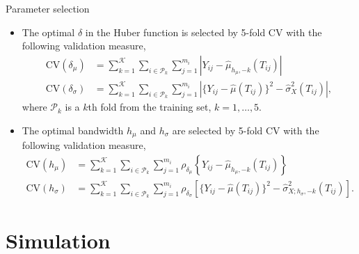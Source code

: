 \documentclass[9pt]{beamer}
\begin{document}
\begin{frame}[allowframebreaks]{Parameter selection}
	\begin{itemize}
		\item{
			The optimal $\delta$ in the Huber function is selected by 5-fold CV with the following validation measure,
			\begin{align*}
				\text{CV}(\delta_{\mu}) &= \sum_{k=1}^{\mathcal{K}} \sum_{i \in \mathcal{P}_k} \sum_{j=1}^{m_i} \left| Y_{ij} - \hat{\mu}_{h_{\mu},-k}(T_{ij}) \right| \\
				\text{CV}(\delta_{\sigma}) &= \sum_{k=1}^{\mathcal{K}} \sum_{i \in \mathcal{P}_k} \sum_{j=1}^{m_i} \left| \{ Y_{ij} - \hat{\mu}(T_{ij}) \}^2 - \hat{\sigma}_X^2(T_{ij}) \right|,
			\end{align*}
			where $\mathcal{P}_k$ is a $k$th fold from the training set, $k=1,\dots,5$.
		}
		\item{
			The optimal bandwidth $h_{\mu}$ and $h_{\sigma}$ are selected by 5-fold CV with the following validation measure,
			\begin{align*}
				\text{CV}(h_{\mu}) &= \sum_{k=1}^{\mathcal{K}} \sum_{i \in \mathcal{P}_k} \sum_{j=1}^{m_i} \rho_{\delta_{\mu}} \left\{ Y_{ij} - \hat{\mu}_{h_{\mu},-k}(T_{ij}) \right\} \\
				\text{CV}(h_{\sigma}) &= \sum_{k=1}^{\mathcal{K}} \sum_{i \in \mathcal{P}_k} \sum_{j=1}^{m_i} \rho_{\delta_{\sigma}} \left[ \{ Y_{ij} - \hat{\mu}(T_{ij}) \}^2 - \hat{\sigma}_{X;h_{\sigma}, -k}^2(T_{ij}) \right].
			\end{align*}
		}
	\end{itemize}
\end{frame}



\section{Simulation}
\end{document}
